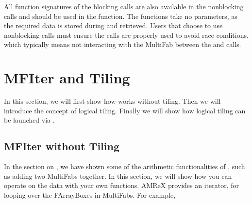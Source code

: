 \documentclass[letterpaper,10pt,english]{sphinxmanual}
\begin{document}
\sphinxAtStartPar
All function signatures of the blocking calls are also available in the non\sphinxhyphen{}blocking
calls and should be used in the  function.  The  functions take no
parameters, as the required data is stored during  and retrieved.  Users that
choose to use non\sphinxhyphen{}blocking calls must ensure the calls are properly used to avoid race
conditions, which typically means not interacting with the MultiFab between the
 and  calls.


\section{MFIter and Tiling}
\label{\detokenize{Basics:mfiter-and-tiling}}\label{\detokenize{Basics:sec-basics-mfiter}}
\sphinxAtStartPar
In this section, we will first show how  works without tiling.
Then we will introduce the concept of logical tiling.  Finally we will show how
logical tiling can be launched via .


\subsection{MFIter without Tiling}
\label{\detokenize{Basics:mfiter-without-tiling}}\label{\detokenize{Basics:sec-basics-mfiter-notiling}}
\sphinxAtStartPar
In the section on {\hyperref[\detokenize{Basics:sec-basics-multifab}]{}}, we have shown some of the
arithmetic functionalities of , such as adding two MultiFabs
together. In this section, we will show how you can operate on the
 data with your own functions. AMReX provides an iterator,
 for looping over the FArrayBoxes in MultiFabs. For example,
\end{document}

